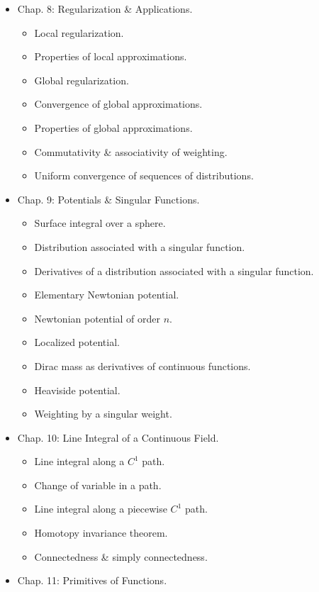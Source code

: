 \documentclass{article}
\begin{document}
\begin{enumerate}
\begin{itemize}
		\item {\sf Chap. 8: Regularization \& Applications.}
		\begin{itemize}
			\item {\sf Local regularization.}
			\item {\sf Properties of local approximations.}
			\item {\sf Global regularization.}
			\item {\sf Convergence of global approximations.}
			\item {\sf Properties of global approximations.}
			\item {\sf Commutativity \& associativity of weighting.}
			\item {\sf Uniform convergence of sequences of distributions.}
		\end{itemize}
		\item {\sf Chap. 9: Potentials \& Singular Functions.}
		\begin{itemize}
			\item {\sf Surface integral over a sphere.}
			\item {\sf Distribution associated with a singular function.}
			\item {\sf Derivatives of a distribution associated with a singular function.}
			\item {\sf Elementary Newtonian potential.}
			\item {\sf Newtonian potential of order $n$.}
			\item {\sf Localized potential.}
			\item {\sf Dirac mass as derivatives of continuous functions.}
			\item {\sf Heaviside potential.}
			\item {\sf Weighting by a singular weight.}
		\end{itemize}
		\item {\sf Chap. 10: Line Integral of a Continuous Field.}
		\begin{itemize}
			\item {\sf Line integral along a $C^1$ path.}
			\item {\sf Change of variable in a path.}
			\item {\sf Line integral along a piecewise $C^1$ path.}
			\item {\sf Homotopy invariance theorem.}
			\item {\sf Connectedness \& simply connectedness.}
		\end{itemize}
		\item {\sf Chap. 11: Primitives of Functions.}

\end{itemize}
\end{enumerate}
\end{document}
